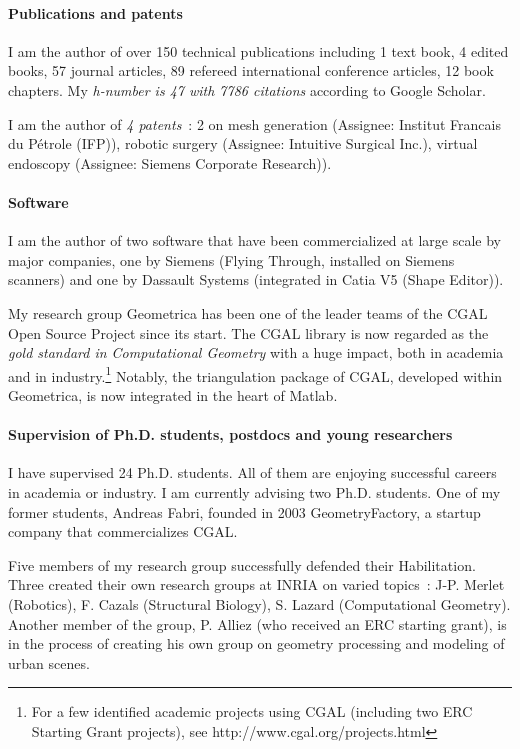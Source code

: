 \paragraph{Publications and patents} \mbox{}

I am the author of over 150 technical publications including 1 text book, 4 edited books, 57 journal articles, 89 refereed international conference articles, 12 book chapters. My {\em h-number is 47 with 7786 citations} according to Google Scholar. 

I am the author of {\em 4 patents}~: 2 on mesh generation (Assignee: Institut Francais du P\'etrole (IFP)), robotic surgery (Assignee: Intuitive Surgical Inc.), virtual endoscopy (Assignee: Siemens Corporate Research)).

\paragraph{Software} \mbox{}

I am the author of two software that have been commercialized at large scale by major companies, one by Siemens (Flying Through, installed on Siemens scanners) and one by Dassault Systems (integrated in Catia V5 (Shape Editor)). 

My research group Geometrica has been one of the leader teams of  the CGAL Open Source Project since its start.  The CGAL library  is now regarded as the {\em gold standard in Computational Geometry} with a huge impact, both in academia and in industry.\footnote{For a few identified academic projects using CGAL (including two ERC Starting Grant projects), see
http://www.cgal.org/projects.html} Notably, the triangulation package of CGAL, developed within Geometrica, is now integrated in the heart of Matlab.

\paragraph{Supervision of Ph.D. students, postdocs and young researchers} \mbox{}

I have supervised 24 Ph.D. students. All of them are enjoying successful careers in academia or industry. I am currently advising two Ph.D. students. One of my former students, Andreas Fabri, founded in 2003 GeometryFactory, a startup company that commercializes CGAL.

Five members of my research group successfully defended their Habilitation.  Three created their own research groups at INRIA on varied topics~: J-P. Merlet (Robotics), F. Cazals (Structural Biology), S. Lazard (Computational Geometry). Another member of the group, P. Alliez (who received an ERC starting grant), is in the process of creating his own group on geometry processing and modeling of urban scenes.

